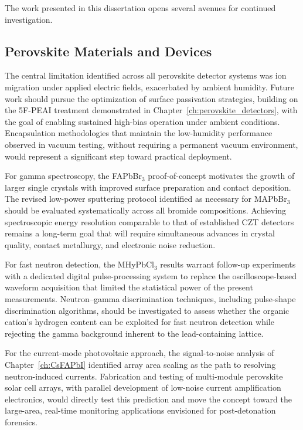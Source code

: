 The work presented in this dissertation opens several avenues for
continued investigation.

\subsection{Perovskite Materials and Devices}

The central limitation identified across all perovskite detector
systems was ion migration under applied electric fields, exacerbated
by ambient humidity.  Future work should pursue the optimization of
surface passivation strategies, building on the 5F-PEAI treatment
demonstrated in Chapter~\ref{ch:perovskite_detectors}, with the goal
of enabling sustained high-bias operation under ambient conditions.
Encapsulation methodologies that maintain the low-humidity performance
observed in vacuum testing, without requiring a permanent vacuum
environment, would represent a significant step toward practical
deployment.

For gamma spectroscopy, the FAPbBr$_3$ proof-of-concept motivates the
growth of larger single crystals with improved surface preparation and
contact deposition.  The revised low-power sputtering protocol
identified as necessary for MAPbBr$_3$ should be evaluated
systematically across all bromide compositions.  Achieving
spectroscopic energy resolution comparable to that of established CZT
detectors remains a long-term goal that will require simultaneous
advances in crystal quality, contact metallurgy, and electronic noise
reduction.

For fast neutron detection, the MHyPbCl$_3$ results warrant follow-up
experiments with a dedicated digital pulse-processing system to replace
the oscilloscope-based waveform acquisition that limited the
statistical power of the present measurements.  Neutron--gamma
discrimination techniques, including pulse-shape discrimination
algorithms, should be investigated to assess whether the organic
cation's hydrogen content can be exploited for fast neutron detection
while rejecting the gamma background inherent to the lead-containing
lattice.

For the current-mode photovoltaic approach, the signal-to-noise
analysis of Chapter~\ref{ch:CsFAPbI} identified array area scaling as
the path to resolving neutron-induced currents.  Fabrication and
testing of multi-module perovskite solar cell arrays, with parallel
development of low-noise current amplification electronics, would
directly test this prediction and move the concept toward the
large-area, real-time monitoring applications envisioned for
post-detonation forensics.


